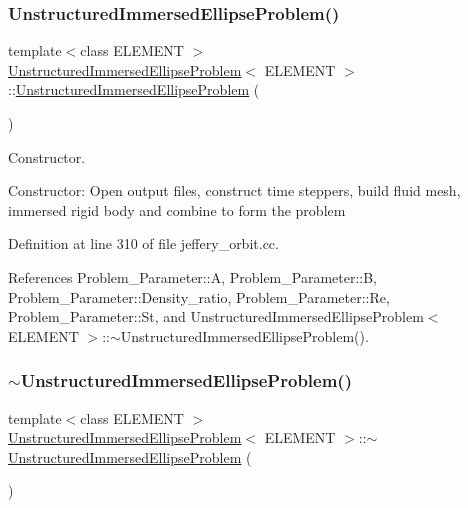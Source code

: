 \subsubsection{\texorpdfstring{Unstructured\+Immersed\+Ellipse\+Problem()}{UnstructuredImmersedEllipseProblem()}}
{\footnotesize\ttfamily template$<$class E\+L\+E\+M\+E\+NT $>$ \\
\hyperlink{classUnstructuredImmersedEllipseProblem}{Unstructured\+Immersed\+Ellipse\+Problem}$<$ E\+L\+E\+M\+E\+NT $>$\+::\hyperlink{classUnstructuredImmersedEllipseProblem}{Unstructured\+Immersed\+Ellipse\+Problem} (\begin{DoxyParamCaption}{ }\end{DoxyParamCaption})}



Constructor. 

Constructor\+: Open output files, construct time steppers, build fluid mesh, immersed rigid body and combine to form the problem 

Definition at line 310 of file jeffery\+\_\+orbit.\+cc.



References Problem\+\_\+\+Parameter\+::A, Problem\+\_\+\+Parameter\+::B, Problem\+\_\+\+Parameter\+::\+Density\+\_\+ratio, Problem\+\_\+\+Parameter\+::\+Re, Problem\+\_\+\+Parameter\+::\+St, and Unstructured\+Immersed\+Ellipse\+Problem$<$ E\+L\+E\+M\+E\+N\+T $>$\+::$\sim$\+Unstructured\+Immersed\+Ellipse\+Problem().

\mbox{\label{classUnstructuredImmersedEllipseProblem_a84cdf81be59fc646eb4d5b3bc0ff4280}} 
\subsubsection{\texorpdfstring{$\sim$\+Unstructured\+Immersed\+Ellipse\+Problem()}{~UnstructuredImmersedEllipseProblem()}}
{\footnotesize\ttfamily template$<$class E\+L\+E\+M\+E\+NT $>$ \\
\hyperlink{classUnstructuredImmersedEllipseProblem}{Unstructured\+Immersed\+Ellipse\+Problem}$<$ E\+L\+E\+M\+E\+NT $>$\+::$\sim$\hyperlink{classUnstructuredImmersedEllipseProblem}{Unstructured\+Immersed\+Ellipse\+Problem} (\begin{DoxyParamCaption}{ }\end{DoxyParamCaption})}



